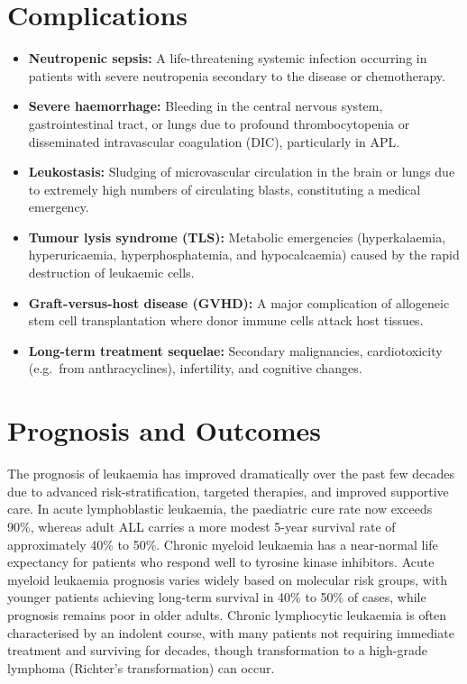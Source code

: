 \section*{Complications}
\begin{itemize}
    \item \textbf{Neutropenic sepsis:} A life-threatening systemic infection occurring in patients with severe neutropenia secondary to the disease or chemotherapy.
    \item \textbf{Severe haemorrhage:} Bleeding in the central nervous system, gastrointestinal tract, or lungs due to profound thrombocytopenia or disseminated intravascular coagulation (DIC), particularly in APL.
    \item \textbf{Leukostasis:} Sludging of microvascular circulation in the brain or lungs due to extremely high numbers of circulating blasts, constituting a medical emergency.
    \item \textbf{Tumour lysis syndrome (TLS):} Metabolic emergencies (hyperkalaemia, hyperuricaemia, hyperphosphatemia, and hypocalcaemia) caused by the rapid destruction of leukaemic cells.
    \item \textbf{Graft-versus-host disease (GVHD):} A major complication of allogeneic stem cell transplantation where donor immune cells attack host tissues.
    \item \textbf{Long-term treatment sequelae:} Secondary malignancies, cardiotoxicity (e.g.\ from anthracyclines), infertility, and cognitive changes.
\end{itemize}

\section*{Prognosis and Outcomes}
The prognosis of leukaemia has improved dramatically over the past few decades due to advanced risk-stratification, targeted therapies, and improved supportive care. In acute lymphoblastic leukaemia, the paediatric cure rate now exceeds 90\%, whereas adult ALL carries a more modest 5-year survival rate of approximately 40\% to 50\%. Chronic myeloid leukaemia has a near-normal life expectancy for patients who respond well to tyrosine kinase inhibitors. Acute myeloid leukaemia prognosis varies widely based on molecular risk groups, with younger patients achieving long-term survival in 40\% to 50\% of cases, while prognosis remains poor in older adults. Chronic lymphocytic leukaemia is often characterised by an indolent course, with many patients not requiring immediate treatment and surviving for decades, though transformation to a high-grade lymphoma (Richter's transformation) can occur.

